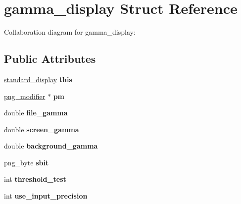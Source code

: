 \hypertarget{structgamma__display}{\section{gamma\+\_\+display Struct Reference}
\label{structgamma__display}
}


Collaboration diagram for gamma\+\_\+display\+:
\subsection*{Public Attributes}
\begin{DoxyCompactItemize}
\item 
\hypertarget{structgamma__display_a0778f53821f276251408fd67e76aa33f}{\hyperlink{structstandard__display}{standard\+\_\+display} {\bfseries this}}\label{structgamma__display_a0778f53821f276251408fd67e76aa33f}

\item 
\hypertarget{structgamma__display_abadf37329092ca5cfa5f9ffe0a8063d2}{\hyperlink{structpng__modifier}{png\+\_\+modifier} $\ast$ {\bfseries pm}}\label{structgamma__display_abadf37329092ca5cfa5f9ffe0a8063d2}

\item 
\hypertarget{structgamma__display_a1a5639b163c343eccb7a332972b61fe7}{double {\bfseries file\+\_\+gamma}}\label{structgamma__display_a1a5639b163c343eccb7a332972b61fe7}

\item 
\hypertarget{structgamma__display_a3513703931454a009740f8c2e524c988}{double {\bfseries screen\+\_\+gamma}}\label{structgamma__display_a3513703931454a009740f8c2e524c988}

\item 
\hypertarget{structgamma__display_a0a1b8c2a28b901b69fae1289b9d7a211}{double {\bfseries background\+\_\+gamma}}\label{structgamma__display_a0a1b8c2a28b901b69fae1289b9d7a211}

\item 
\hypertarget{structgamma__display_a074fa354ed2cca3ea8f4e21889534c7a}{png\+\_\+byte {\bfseries sbit}}\label{structgamma__display_a074fa354ed2cca3ea8f4e21889534c7a}

\item 
\hypertarget{structgamma__display_a3e3a17f2653cc142242a0ce9a5a6a15b}{int {\bfseries threshold\+\_\+test}}\label{structgamma__display_a3e3a17f2653cc142242a0ce9a5a6a15b}

\item 
\hypertarget{structgamma__display_a1123c910fc176dc082a8b3712bb74ac1}{int {\bfseries use\+\_\+input\+\_\+precision}}\label{structgamma__display_a1123c910fc176dc082a8b3712bb74ac1}


\end{DoxyCompactItemize}
